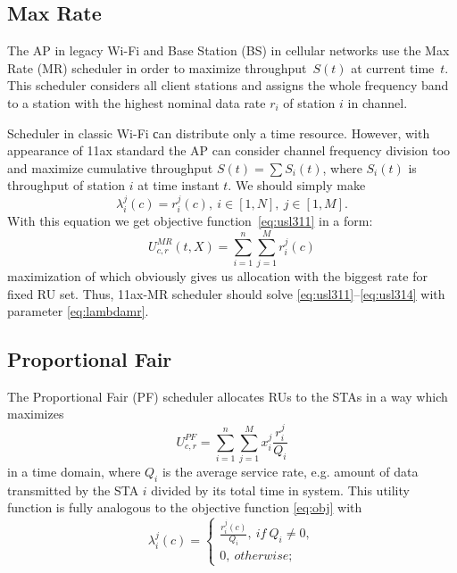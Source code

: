 \subsection{Max Rate}

The AP in legacy Wi-Fi and Base Station (BS) in cellular networks use the Max Rate (MR) scheduler in order to maximize  throughput~$S(t)$ at current time~$t$. This scheduler considers all client stations and assigns the whole frequency band to a station with the highest nominal data rate $r_i$ of station $i$ in channel.

Scheduler in classic Wi-Fi сan distribute only a time resource.
However, with appearance of 11ax standard the AP can consider channel frequency division too and maximize cumulative throughput $S(t) = \sum S_i(t)$, where $S_i(t)$ is throughput of station $i$ at time instant $t$. We should simply make   
\begin{equation}
\label{eq:lambdamr}
\lambda_i^j (c) = r_i^j (c),\ i \in [1,N],\ j \in [1, M].
\end{equation}
With this equation we get objective function~\eqref{eq:usl311} in a form:
\begin{equation}
\label{eq:11axmrutility}
U^{MR}_{c,r}(t,X) = \sum_{i = 1}^{n} \sum_{j = 1}^{M} r_i^j (c)
\end{equation}
maximization of which obviously gives us allocation with the biggest rate for fixed RU set. Thus, 11ax-MR scheduler should solve \eqref{eq:usl311}--\eqref{eq:usl314} with parameter \eqref{eq:lambdamr}.

\subsection{Proportional Fair}

The Proportional Fair (PF) scheduler allocates RUs to the STAs in a way which maximizes 
\begin{equation}
\label{eq:11axpfutility}
U_{c,r}^{PF} = \sum_{i=1}^{n}\sum_{j=1}^{M} x_i^j \frac{r_i^j}{Q_i}
\end{equation}
in a time domain, where $Q_i$ is the average service rate, e.g. amount of data transmitted by the STA $i$ divided by its total time in system. This utility function is fully analogous to the objective function \eqref{eq:obj} with
\begin{equation}
\label{eq:pflambda}
\lambda_i^j (c) = \begin{cases}
\frac{r_i^j(c)}{Q_i},\ if\ Q_i \ne 0,\\
0,\ otherwise;
\end{cases}
\end{equation}

